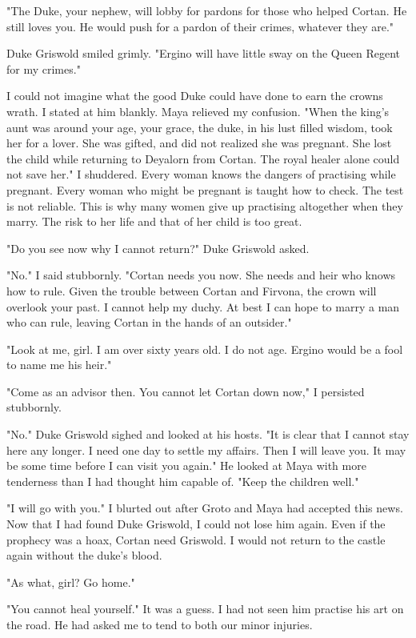 \documentclass{article}
\begin{document}
"The Duke, your nephew, will lobby for pardons for those who helped Cortan. He still loves you. He would push for a pardon of their crimes, whatever they are."

Duke Griswold smiled grimly. "Ergino will have little sway on the Queen Regent for my crimes."

I could not imagine what the good Duke could have done to earn the crowns wrath. I stated at him blankly. Maya relieved my confusion. "When the king's aunt was around your age, your grace, the duke, in his lust filled wisdom, took her for a lover. She was gifted, and did not realized she was pregnant. She lost the child while returning to Deyalorn from Cortan. The royal healer alone could not save her." I shuddered. Every woman knows the dangers of practising while pregnant. Every woman who might be pregnant is taught how to check. The test is not reliable. This is why many women give up practising altogether when they marry. The risk to her life and that of her child is too great. 

"Do you see now why I cannot return?" Duke Griswold asked.

"No." I said stubbornly. "Cortan needs you now. She needs and heir who knows how to rule. Given the trouble between Cortan and Firvona, the crown will overlook your past. I cannot help my duchy. At best I can hope to marry a man who can rule, leaving Cortan in the hands of an outsider."

"Look at me, girl. I am over sixty years old. I do not age. Ergino would be a fool to name me his heir."

"Come as an advisor then. You cannot let Cortan down now," I persisted stubbornly.

"No." Duke Griswold sighed and looked at his hosts. "It is clear that I cannot stay here any longer. I need one day to settle my affairs. Then I will leave you. It may be some time before I can visit you again." He looked at Maya with more tenderness than I had thought him capable of. "Keep the children well."

"I will go with you." I blurted out after Groto and Maya had accepted this news. Now that I had found Duke Griswold, I could not lose him again. Even if the prophecy was a hoax, Cortan need Griswold. I would not return to the castle again without the duke's blood.

"As what, girl? Go home."

"You cannot heal yourself." It was a guess. I had not seen him practise his art on the road. He had asked me to tend to both our minor injuries.
\end{document}
